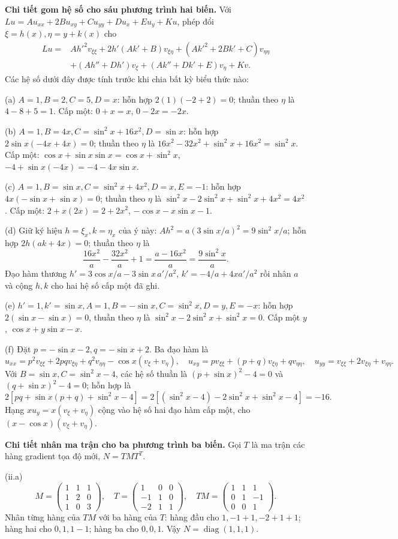 \textbf{Chi tiết gom hệ số cho sáu phương trình hai biến.} Với $Lu=Au_{xx}+2Bu_{xy}+Cu_{yy}+Du_x+Eu_y+Ku$, phép đổi $\xi=h(x),\eta=y+k(x)$ cho
\[\begin{aligned}
L u={}&Ah'^2v_{\xi\xi}+2h'(Ak'+B)v_{\xi\eta}
+(Ak'^2+2Bk'+C)v_{\eta\eta}\\
&+(Ah''+Dh')v_\xi+(Ak''+Dk'+E)v_\eta+Kv.
\end{aligned}\]
Các hệ số dưới đây được tính trước khi chia bất kỳ biểu thức nào:

(a) $A=1,B=2,C=5,D=x$: hỗn hợp $2(1)(-2+2)=0$; thuần theo $\eta$ là $4-8+5=1$. Cấp một: $0+x=x$, $0-2x=-2x$.

(b) $A=1,B=4x,C=\sin^2x+16x^2,D=\sin x$: hỗn hợp $2\sin x(-4x+4x)=0$; thuần theo $\eta$ là $16x^2-32x^2+\sin^2x+16x^2=\sin^2x$. Cấp một: $\cos x+\sin x\sin x=\cos x+\sin^2x$, $-4+\sin x(-4x)=-4-4x\sin x$.

(c) $A=1,B=\sin x,C=\sin^2x+4x^2,D=x,E=-1$: hỗn hợp $4x(-\sin x+\sin x)=0$; thuần theo $\eta$ là $\sin^2x-2\sin^2x+\sin^2x+4x^2=4x^2$. Cấp một: $2+x(2x)=2+2x^2$, $-\cos x-x\sin x-1$.

(d) Giữ ký hiệu $h=\xi_x,k=\eta_x$ của ý này: $Ah^2=a(3\sin x/a)^2=9\sin^2x/a$; hỗn hợp $2h(ak+4x)=0$; thuần theo $\eta$ là
\[\frac{16x^2}a-\frac{32x^2}a+1=\frac{a-16x^2}a=\frac{9\sin^2x}a.\]
Đạo hàm thương $h'=3\cos x/a-3\sin x\,a'/a^2$, $k'=-4/a+4xa'/a^2$ rồi nhân $a$ và cộng $h,k$ cho hai hệ số cấp một đã ghi.

(e) $h'=1,k'=\sin x,A=1,B=-\sin x,C=\sin^2x,D=y,E=-x$: hỗn hợp $2(\sin x-\sin x)=0$, thuần theo $\eta$ là $\sin^2x-2\sin^2x+\sin^2x=0$. Cấp một $y$, $\cos x+y\sin x-x$.

(f) Đặt $p=-\sin x-2,q=-\sin x+2$. Ba đạo hàm là
\[u_{xx}=p^2v_{\xi\xi}+2pqv_{\xi\eta}+q^2v_{\eta\eta}-\cos x(v_\xi+v_\eta),\quad
u_{xy}=pv_{\xi\xi}+(p+q)v_{\xi\eta}+qv_{\eta\eta},\quad
u_{yy}=v_{\xi\xi}+2v_{\xi\eta}+v_{\eta\eta}.\]
Với $B=\sin x,C=\sin^2x-4$, các hệ số thuần là $(p+\sin x)^2-4=0$ và $(q+\sin x)^2-4=0$; hỗn hợp là
\[2[pq+\sin x(p+q)+\sin^2x-4]
=2[(\sin^2x-4)-2\sin^2x+\sin^2x-4]=-16.\]
Hạng $xu_y=x(v_\xi+v_\eta)$ cộng vào hệ số hai đạo hàm cấp một, cho $(x-\cos x)(v_\xi+v_\eta)$.

\textbf{Chi tiết nhân ma trận cho ba phương trình ba biến.} Gọi $T$ là ma trận các hàng gradient tọa độ mới, $N=TMT^T$.

(ii.a)
\[M=\begin{pmatrix}1&1&1\\1&2&0\\1&0&3\end{pmatrix},\quad
T=\begin{pmatrix}1&0&0\\-1&1&0\\-2&1&1\end{pmatrix},\quad
TM=\begin{pmatrix}1&1&1\\0&1&-1\\0&0&1\end{pmatrix}.\]
Nhân từng hàng của $TM$ với ba hàng của $T$: hàng đầu cho $1,-1+1,-2+1+1$; hàng hai cho $0,1,1-1$; hàng ba cho $0,0,1$. Vậy $N=\operatorname{diag}(1,1,1)$.

